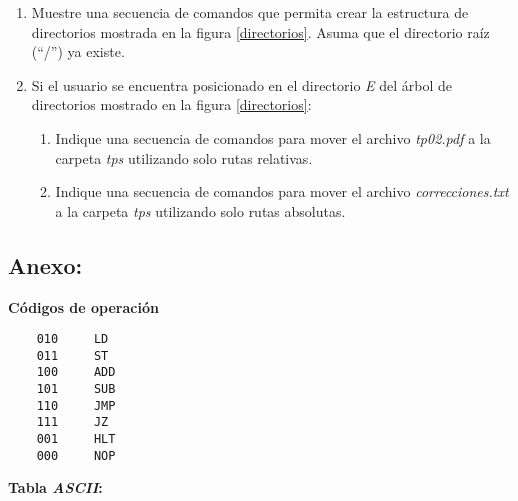 \documentclass[12pt]{article}
\begin{document}
\begin{enumerate}
\begin{enumerate}
        \end{enumerate}

    \item Muestre una secuencia de comandos que permita crear la estructura de
        directorios mostrada en la figura \ref{directorios}. Asuma que el
        directorio raíz (``/'') ya existe.

    \item Si el usuario se encuentra posicionado en el directorio \emph{E} del
        árbol de directorios mostrado en la figura \ref{directorios}:

        \begin{enumerate}

            \item Indique una secuencia de comandos para mover el archivo
                \emph{tp02.pdf} a la carpeta \emph{tps} utilizando solo rutas
                relativas.

            \item Indique una secuencia de comandos para mover el archivo
                \emph{correcciones.txt} a la carpeta \emph{tps} utilizando
                solo rutas absolutas.

        \end{enumerate}

\end{enumerate}

\subsection*{ \large\textbf{Anexo:} }

\textbf{Códigos de operación}

\begin{verbatim}
    010     LD
    011     ST
    100     ADD
    101     SUB
    110     JMP
    111     JZ
    001     HLT
    000     NOP
\end{verbatim}

\textbf{Tabla \emph{ASCII}:}
\end{document}
